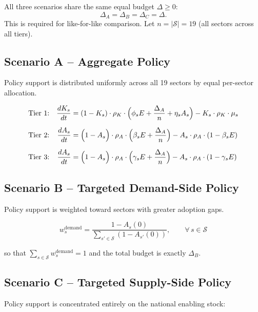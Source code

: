 \documentclass[11pt,a4paper]{article}
\begin{document}
All three scenarios share the same equal budget $\Delta \geq 0$:
\[
\Delta_A = \Delta_B = \Delta_C = \Delta.
\]
This is required for like-for-like comparison. Let $n = |\mathcal{S}| = 19$ (all sectors across all tiers).

\subsection{Scenario A -- Aggregate Policy}

Policy support is distributed uniformly across all 19 sectors by equal per-sector allocation.

\begin{equation}
\begin{aligned}
&\text{Tier~1:} &\frac{dK_s}{dt} &= (1 - K_s)\cdot\rho_K\cdot\Bigl(\phi_s E + \frac{\Delta_A}{n} + \eta_s A_s\Bigr) - K_s\cdot\rho_K\cdot\mu_s \\[6pt]
&\text{Tier~2:} &\frac{dA_s}{dt} &= \Bigl(1 - A_s\Bigr)\cdot\rho_A\cdot\Bigl(\beta_s E + \frac{\Delta_A}{n}\Bigr) - A_s\cdot\rho_A\cdot(1 - \beta_s E) \\[6pt]
&\text{Tier~3:} &\frac{dA_s}{dt} &= \Bigl(1 - A_s\Bigr)\cdot\rho_A\cdot\Bigl(\gamma_s E + \frac{\Delta_A}{n}\Bigr) - A_s\cdot\rho_A\cdot(1 - \gamma_s E)
\end{aligned}
\label{eq:scenA}
\end{equation}

\subsection{Scenario B -- Targeted Demand-Side Policy}

Policy support is weighted toward sectors with greater adoption gaps.

\begin{equation}
w_s^{\text{demand}} = \frac{1 - A_s(0)}{\displaystyle\sum_{s' \in \mathcal{S}}(1 - A_{s'}(0))}, \qquad \forall\, s \in \mathcal{S}
\label{eq:demandweight}
\end{equation}

so that $\sum_{s \in \mathcal{S}} w_s^{\text{demand}} = 1$ and the total budget is exactly $\Delta_B$.

\subsection{Scenario C -- Targeted Supply-Side Policy}

Policy support is concentrated entirely on the national enabling stock:
\end{document}
